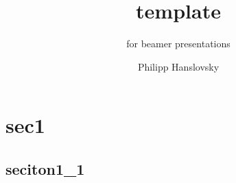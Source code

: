 \documentclass[pdflatex,compress]{beamer}
\title{template}
\subtitle{for beamer presentations}
\author{Philipp Hanslovsky}
\begin{document}
\maketitle
\section{sec1}
\subsection{seciton1_1}

\end{document}
